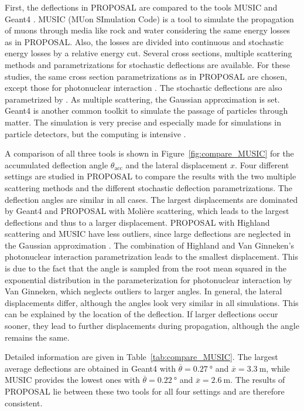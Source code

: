 \documentclass[pdflatex, sn-mathphys]{sn-jnl}%
\theoremstyle{thmstyleone}%
\theoremstyle{thmstyletwo}%
\theoremstyle{thmstylethree}%
\begin{document}
First, the deflections in PROPOSAL are compared to 
the tools MUSIC \cite{MUSIC,comparison_MUSIC_GEANT4_2009} and Geant4 \cite{GEANT4}.
MUSIC (MUon SImulation Code) is a tool to simulate the propagation of muons 
through media like rock and water considering the same energy losses as in 
PROPOSAL. Also, the losses are divided into continuous and stochastic 
energy losses by a relative energy cut. Several cross sections, multiple scattering 
methods and parametrizations for stochastic deflections are 
available. For these studies, the same cross section parametrizations 
as in PROPOSAL are chosen, except those for 
photonuclear interaction \cite{nulcint_bugaev_Shlepin, bugaev_1980_defl,bugaev_1981_defl}. The stochastic deflections are also parametrized by \cite{Van_Ginneken}. 
As multiple scattering, the Gaussian 
approximation \cite{HIGHLAND_1975} is set. 
Geant4 is another common toolkit to simulate the passage of particles through 
matter. The simulation is very precise and especially 
made for simulations in particle detectors, but the computing is 
intensive \cite{GEANT4}. 

A comparison of all three tools is shown in Figure~\ref{fig:compare_MUSIC} 
for the 
accumulated deflection angle $\theta_{\text{acc}}$ and the lateral displacement
$x$. Four different settings are studied in PROPOSAL to compare the results with 
the two multiple scattering methods and the different stochastic deflection parametrizations.
The deflection angles are 
similar in all cases. The 
largest displacements are dominated by Geant4 and PROPOSAL with Molière scattering, which 
leads to the largest deflections and thus to a larger displacement. 
PROPOSAL with Highland scattering and MUSIC have less outliers, since large 
deflections are neglected in the Gaussian approximation \cite{HIGHLAND_1975}. 
The combination of Highland and 
Van Ginneken's photonuclear interaction parametrization leads to the smallest 
displacement. This is due to the fact that the angle is sampled from the root mean squared in the exponential distribution
in the parameterization for photonuclear interaction by Van Ginneken, which neglects 
outliers to larger angles. 
In general, the lateral displacements differ, although the angles look very similar in all simulations. 
This can be explained by the location of the deflection. If larger deflections occur sooner, 
they lead to further displacements during propagation, although the angle remains the same.

Detailed information are given in Table~\ref{tab:compare_MUSIC}. 
The largest average deflections are obtained in Geant4 with 
$\overline{\theta} = \SI{0.27}{\degree}$ 
and $\overline{x} = \SI{3.3}{\meter}$, while MUSIC provides the lowest 
ones with $\overline{\theta} = \SI{0.22}{\degree}$ and 
$\overline{x} = \SI{2.6}{\meter}$.
The results of PROPOSAL lie between 
these two tools for all four settings and are therefore consistent. 
\end{document}
